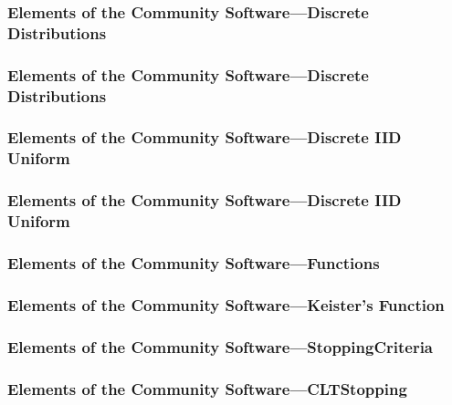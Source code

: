 \documentclass[11pt,compress,xcolor={usenames,dvipsnames},aspectratio=169]{beamer}
\newcommand{\ProgDir}{../../MATLAB_Prototype}
\begin{document}
\begin{frame}[fragile]
\frametitle{Elements of the Community Software---Discrete Distributions}
\vspace{-5ex}

\end{frame}

\begin{frame}[fragile]
\frametitle{Elements of the Community Software---Discrete Distributions}
\vspace{-5ex}

\end{frame}

\begin{frame}[fragile]
\frametitle{Elements of the Community Software---Discrete IID Uniform}
\vspace{-5ex}

\end{frame}

\begin{frame}[fragile]
\frametitle{Elements of the Community Software---Discrete IID Uniform}
\vspace{-5ex}

\end{frame}

\begin{frame}[fragile]
\frametitle{Elements of the Community Software---Functions}
\vspace{-5ex}

\end{frame}

\begin{frame}[fragile]
\frametitle{Elements of the Community Software---Keister's Function}
\vspace{-5ex}

\end{frame}

\begin{frame}[fragile]
\frametitle{Elements of the Community Software---StoppingCriteria}
\vspace{-5ex}

\end{frame}

\begin{frame}[fragile]
\frametitle{Elements of the Community Software---CLTStopping}
\vspace{-5ex}

\end{frame}
\end{document}
